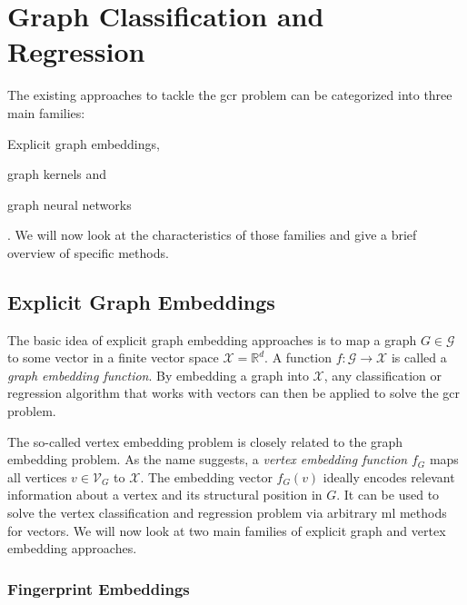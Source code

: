 \section{Graph Classification and Regression}%
\label{sec:related:gcr}

The existing approaches to tackle the \ac{gcr} problem can be categorized into three main families:
\begin{enumerate*}
	\item Explicit graph embeddings,
	\item graph kernels and
	\item graph neural networks
\end{enumerate*}.
We will now look at the characteristics of those families and give a brief overview of specific methods.

\subsection{Explicit Graph Embeddings}%
\label{sec:related:gcr:embed}

The basic idea of explicit graph embedding approaches is to map a graph $G \in \mathcal{G}$ to some vector in a finite vector space $\mathcal{X} = \mathbb{R}^d$.
A function $f: \mathcal{G} \to \mathcal{X}$ is called a \textit{graph embedding function}.
By embedding a graph into $\mathcal{X}$, any classification or regression algorithm that works with vectors can then be applied to solve the \ac{gcr} problem.

The so-called vertex embedding problem is closely related to the graph embedding problem.
As the name suggests, a \textit{vertex embedding function} $f_G$ maps all vertices $v \in \mathcal{V}_G$ to $\mathcal{X}$.
The embedding vector $f_G(v)$ ideally encodes relevant information about a vertex and its structural position in $G$.
It can be used to solve the vertex classification and regression problem via arbitrary \ac{ml} methods for vectors.
We will now look at two main families of explicit graph and vertex embedding approaches.

\subsubsection{Fingerprint Embeddings}

